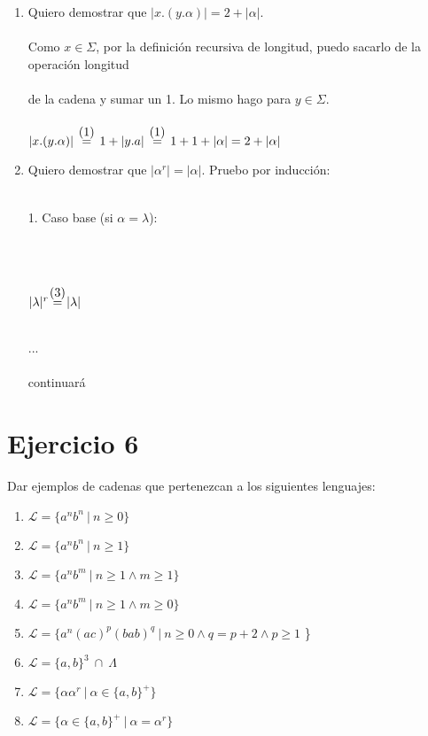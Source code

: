 \documentclass{article}
\begin{document}
{{\begin{enumerate}[label=\alph*.,font=\itshape]
    \item {Quiero demostrar que $|x.(y.\alpha)| = 2 + |\alpha|$.
    \\
    \\
    {Como $x \in \Sigma$, por la definición recursiva de longitud, puedo sacarlo de la operación longitud \\ \\ de la cadena y sumar un 1. Lo mismo hago para $y \in \Sigma$.}
    \\
    \\
$|x.(y.\alpha)| \ \ {\stackrel{\mathclap{\normalfont\mbox{(1)}}}{=}} \ \ 1 + |y.a| \ \ {\stackrel{\mathclap{\normalfont\mbox{(1)}}}{=}} \ \ 1 + 1 + |\alpha| = 2 + |\alpha|$}
    \\ 
    \item {Quiero demostrar que $|\alpha^r|=|\alpha|$. Pruebo por inducción: \\ \\
    \centerline{1. Caso base (si $\alpha = \lambda$):}
    \\
    \\
    \centerline{$|\lambda|^r{ \ \stackrel{\mathclap{\normalfont\mbox{(3)}}}{=}} \ |\lambda|$}
    \\
    ...
    \\
    \\
    continuará}
\end{enumerate}

\section*{Ejercicio 6}{Dar ejemplos de cadenas que pertenezcan a los siguientes lenguajes:}
\begin{enumerate}[label=\alph*.,font=\itshape]
    \item {$\mathcal{L} = \{a^nb^n \ | \ n \geq 0\}$}
    \item {$\mathcal{L} = \{a^nb^n \ | \ n \geq 1\}$}
    \item {$\mathcal{L} = \{a^nb^m \ | \ n \geq 1 \land m \geq 1\}$}
    \item {$\mathcal{L} = \{a^nb^m \ | \ n \geq 1 \land m \geq 0\}$}
    \item {$ \mathcal{L} = \{ a^n(ac)^p(bab)^q \ | \ n \geq 0 \land q = p + 2 \land p \geq 1$ \}}
    \item {$\mathcal{L} = \{ a, b \}^3 \ \cap \ \Lambda $}
    \item {$\mathcal{L} = \{ \alpha\alpha^r \ | \ \alpha \in \{ a,b \} ^+\}$}
    \item {$\mathcal{L} = \{ \alpha \in \{ a,b \} ^+ \ | \ \alpha = \alpha^r \}$ \\ \\}
\end{enumerate}

}}
\end{document}
